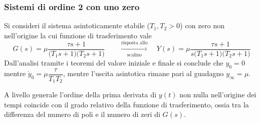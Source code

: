 		\subsubsection{Sistemi di ordine 2 con uno zero}
			Si consideri il sistema asintoticamente stabile ($T_1,T_2>0$) con zero non nell'origine la cui funzione di trasferimento vale
			\[ G(s) = \mu \frac{\tau s + 1}{\big(T_1s +1\big)\big(T_2s+1\big)} \qquad \xrightarrow[\textrm{scalino}]{\textrm{risposta allo}} \quad Y(s) = \mu \frac{\tau s + 1}{s\big(T_1s +1\big)\big(T_2s+1\big)} \]
			Dall'analisi tramite i teoremi del valore iniziale e finale si conclude che $y_0=0$ mentre $\dot y_0 = \mu \dfrac{\tau}{T_1T_2}$, mentre l'uscita asintotica rimane pari al guadagno $y_\infty = \mu$.
			\begin{concetto}
				A livello generale l'ordine della prima derivata di $y(t)$ non nulla nell'origine dei tempi coincide con il grado relativo della funzione di trasferimento, ossia tra la differenza del numero di poli e il numero di zeri di $G(s)$.
			\end{concetto}
			
